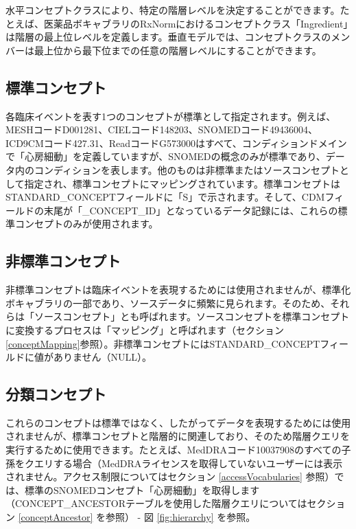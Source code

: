 \documentclass[
  11pt]{book}
\theoremstyle{definition}
\theoremstyle{definition}
\theoremstyle{definition}
\theoremstyle{definition}
\theoremstyle{remark}
\begin{document}
水平コンセプトクラスにより、特定の階層レベルを決定することができます。たとえば、医薬品ボキャブラリのRxNormにおけるコンセプトクラス「Ingredient」は階層の最上位レベルを定義します。垂直モデルでは、コンセプトクラスのメンバーは最上位から最下位までの任意の階層レベルにすることができます。

\subsection{標準コンセプト}\label{standardConcepts}

各臨床イベントを表す1つのコンセプトが標準として指定されます。例えば、MESHコードD001281、CIELコード148203、SNOMEDコード49436004、ICD9CMコード427.31、ReadコードG573000はすべて、コンディションドメインで「心房細動」を定義していますが、SNOMEDの概念のみが標準であり、データ内のコンディションを表します。他のものは非標準またはソースコンセプトとして指定され、標準コンセプトにマッピングされています。標準コンセプトはSTANDARD\_CONCEPTフィールドに「S」で示されます。そして、CDMフィールドの末尾が「\_CONCEPT\_ID」となっているデータ記録には、これらの標準コンセプトのみが使用されます。 

\subsection{非標準コンセプト}\label{ux975eux6a19ux6e96ux30b3ux30f3ux30bbux30d7ux30c8}

非標準コンセプトは臨床イベントを表現するためには使用されませんが、標準化ボキャブラリの一部であり、ソースデータに頻繁に見られます。そのため、それらは「ソースコンセプト」とも呼ばれます。ソースコンセプトを標準コンセプトに変換するプロセスは「マッピング」と呼ばれます（セクション \ref{conceptMapping}参照）。非標準コンセプトにはSTANDARD\_CONCEPTフィールドに値がありません（NULL）。

\subsection{分類コンセプト}\label{ux5206ux985eux30b3ux30f3ux30bbux30d7ux30c8}

これらのコンセプトは標準ではなく、したがってデータを表現するためには使用されませんが、標準コンセプトと階層的に関連しており、そのため階層クエリを実行するために使用できます。たとえば、MedDRAコード10037908のすべての子孫をクエリする場合（MedDRAライセンスを取得していないユーザーには表示されません。アクセス制限についてはセクション \ref{accessVocabularies} 参照）では、標準のSNOMEDコンセプト「心房細動」を取得します（CONCEPT\_ANCESTORテーブルを使用した階層クエリについてはセクション \ref{conceptAncestor} を参照） - 図 \ref{fig:hierarchy} を参照。 
\end{document}
